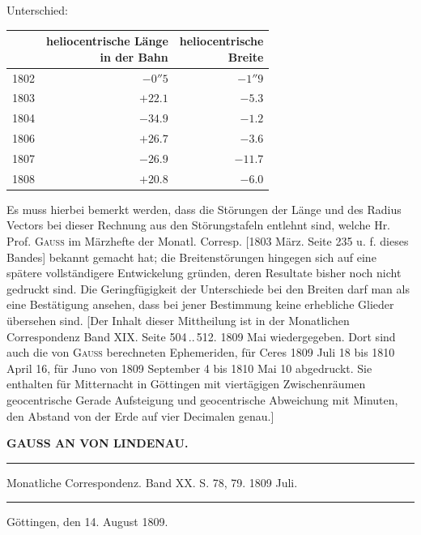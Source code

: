 \begin{center} Unterschied:
\end{center}


\begin{center}\fontsize{10}{12}\selectfont\setlength{\tabcolsep}{5pt}\renewcommand{\arraystretch}{1.15}\begin{tabular}{crr}  & \shortstack{heliocentrische Länge\\in der Bahn} & \shortstack{heliocentrische\\Breite}\\\hline 1802 & $-0''5$ & $-1''9$\\ 1803 & $+22.1$ & $-5.3$\\ 1804 & $-34.9$ & $-1.2$\\ 1806 & $+26.7$ & $-3.6$\\ 1807 & $-26.9$ & $-11.7$\\ 1808 & $+20.8$ & $-6.0$\\
\end{tabular}\end{center}


\par\noindent Es muss hierbei bemerkt werden, dass die Störungen der Länge und des Radius Vectors bei dieser Rechnung aus den Störungstafeln entlehnt sind, welche Hr. Prof. \textsc{Gauss} im Märzhefte der Monatl. Corresp. [1803 März. Seite 235 u. f. dieses Bandes] bekannt gemacht hat; die Breitenstörungen hingegen sich auf eine spätere vollständigere Entwickelung gründen, deren Resultate bisher noch nicht gedruckt sind. Die Geringfügigkeit der Unterschiede bei den Breiten darf man als eine Bestätigung ansehen, dass bei jener Bestimmung keine erhebliche Glieder übersehen sind. [Der Inhalt dieser Mittheilung ist in der Monatlichen Correspondenz Band XIX. Seite 504\,..\,512. 1809 Mai wiedergegeben. Dort sind auch die von \textsc{Gauss} berechneten Ephemeriden, für Ceres 1809 Juli 18 bis 1810 April 16, für Juno von 1809 September 4 bis 1810 Mai 10 abgedruckt. Sie enthalten für Mitternacht in Göttingen mit viertägigen Zwischenräumen geocentrische Gerade Aufsteigung und geocentrische Abweichung mit Minuten, den Abstand von der Erde auf vier Decimalen genau.]

\clearpage
{}
\begin{center}
\textbf{GAUSS AN VON LINDENAU.}
\par\vspace{4pt}\hrule\vspace{4pt}
\fontsize{10}{12}\selectfont Monatliche Correspondenz. Band XX. S. 78, 79. 1809 Juli.
\par\vspace{4pt}\hrule\vspace{4pt}
\end{center}
\begin{flushright} Göttingen, den 14. August 1809.
\end{flushright}

